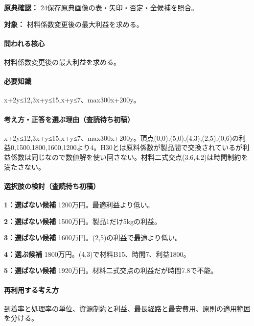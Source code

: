\noindent\textbf{原典確認：} 24保存原典画像の表・矢印・否定・全候補を照合。\par

\noindent\textbf{対象：} 材料係数変更後の最大利益を求める。\par

\paragraph{問われる核心} 材料係数変更後の最大利益を求める。

\paragraph{必要知識} x+2y≤12,3x+y≤15,x+y≤7、max300x+200y。

\paragraph{考え方・正答を選ぶ理由（査読待ち初稿）} x+2y≤12,3x+y≤15,x+y≤7、max300x+200y。頂点(0,0),(5,0),(4,3),(2,5),(0,6)の利益0,1500,1800,1600,1200より4。H30とは原料係数が製品間で交換されているが利益係数は同じなので数値解を使い回さない。材料二式交点(3.6,4.2)は時間制約を満たさない。

\paragraph{選択肢の検討（査読待ち初稿）}\mbox{}\par

\noindent\textbf{1：選ばない候補} 1200万円。最適利益より低い。\par

\noindent\textbf{2：選ばない候補} 1500万円。製品1だけ5kgの利益。\par

\noindent\textbf{3：選ばない候補} 1600万円。(2,5)の利益で最適より低い。\par

\noindent\textbf{4：選ぶ候補} 1800万円。(4,3)で材料B15、時間7、利益1800。\par

\noindent\textbf{5：選ばない候補} 1920万円。材料二式交点の利益だが時間7.8で不能。\par

\paragraph{再利用する考え方} 到着率と処理率の単位、資源制約と利益、最長経路と最安費用、原則の適用範囲を分ける。

